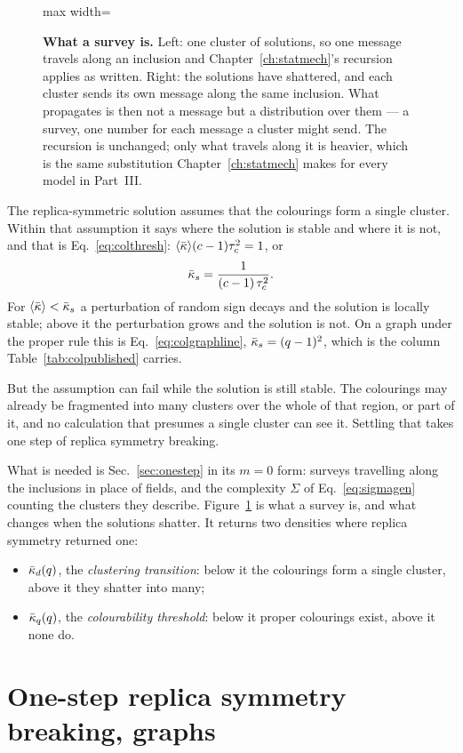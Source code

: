 \begin{figure}[t]
\begin{adjustbox}{max width=\linewidth}
\begin{tikzpicture}[x=1cm,y=1cm]
\end{tikzpicture}
\end{adjustbox}
\caption{\textbf{What a survey is.} Left: one cluster of solutions, so one
message travels along an inclusion and Chapter~\ref{ch:statmech}'s recursion
applies as written. Right: the solutions have shattered, and each cluster sends
its own message along the same inclusion. What propagates is then not a message
but a distribution over them --- a survey, one number for each message a cluster
might send. The recursion is unchanged; only what travels along it is heavier,
which is the same substitution Chapter~\ref{ch:statmech} makes for every model
in Part~III.}
\label{fig:survey}
\end{figure}

The replica-symmetric solution assumes that the colourings form a single
cluster. Within that assumption it says where the solution is stable and where
it is not, and that is Eq.~\eqref{eq:colthresh}:
$\langle \bar\kappa \rangle(c-1)\tau_{c}^{2}=1$, or
\[
  \bar\kappa_{s}=\frac{1}{(c-1)\,\tau_{c}^{2}}.
\]
For $\langle \bar\kappa \rangle<\bar\kappa_{s}$ a perturbation of random sign decays and the
solution is locally stable; above it the perturbation grows and the solution is
not. On a graph under the proper rule this is Eq.~\eqref{eq:colgraphline},
$\bar\kappa_{s}=(q-1)^{2}$, which is the column
Table~\ref{tab:colpublished} carries.

But the assumption can fail while the solution is still stable. The colourings
may already be fragmented into many clusters over the whole of that region, or
part of it, and no calculation that presumes a single cluster can see it.
Settling that takes one step of replica symmetry breaking.

What is needed is Sec.~\ref{sec:onestep} in its $m=0$ form: surveys travelling
along the inclusions in place of fields, and the complexity $\Sigma$ of
Eq.~\eqref{eq:sigmagen} counting the clusters they describe.
Figure~\ref{fig:survey} is what a survey is, and what changes when the
solutions shatter. It returns two densities where replica symmetry returned
one:
\begin{itemize}\setlength{\itemsep}{2pt}
\item $\bar\kappa_{d}(q)$, the \emph{clustering transition}: below it the
      colourings form a single cluster, above it they shatter into many;
\item $\bar\kappa_{q}(q)$, the \emph{colourability threshold}: below it proper
      colourings exist, above it none do.
\end{itemize}
\section{One-step replica symmetry breaking, graphs}
\label{sec:colouring-sp-graph}

